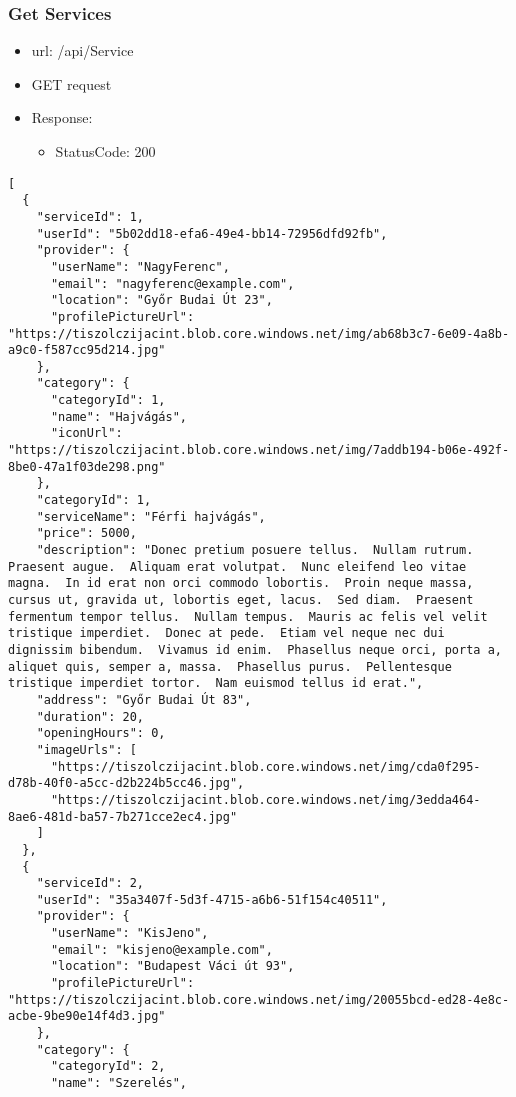 \documentclass[11pt]{article}
\begin{document}
\subsubsection{Get Services}
\label{sec:org1448e36}
\begin{itemize}
\item url: /api/Service
\item GET request
\item Response:
\begin{itemize}
\item StatusCode: 200
\end{itemize}
\end{itemize}
\begin{verbatim}
[
  {
    "serviceId": 1,
    "userId": "5b02dd18-efa6-49e4-bb14-72956dfd92fb",
    "provider": {
      "userName": "NagyFerenc",
      "email": "nagyferenc@example.com",
      "location": "Győr Budai Út 23",
      "profilePictureUrl": "https://tiszolczijacint.blob.core.windows.net/img/ab68b3c7-6e09-4a8b-a9c0-f587cc95d214.jpg"
    },
    "category": {
      "categoryId": 1,
      "name": "Hajvágás",
      "iconUrl": "https://tiszolczijacint.blob.core.windows.net/img/7addb194-b06e-492f-8be0-47a1f03de298.png"
    },
    "categoryId": 1,
    "serviceName": "Férfi hajvágás",
    "price": 5000,
    "description": "Donec pretium posuere tellus.  Nullam rutrum.  Praesent augue.  Aliquam erat volutpat.  Nunc eleifend leo vitae magna.  In id erat non orci commodo lobortis.  Proin neque massa, cursus ut, gravida ut, lobortis eget, lacus.  Sed diam.  Praesent fermentum tempor tellus.  Nullam tempus.  Mauris ac felis vel velit tristique imperdiet.  Donec at pede.  Etiam vel neque nec dui dignissim bibendum.  Vivamus id enim.  Phasellus neque orci, porta a, aliquet quis, semper a, massa.  Phasellus purus.  Pellentesque tristique imperdiet tortor.  Nam euismod tellus id erat.",
    "address": "Győr Budai Út 83",
    "duration": 20,
    "openingHours": 0,
    "imageUrls": [
      "https://tiszolczijacint.blob.core.windows.net/img/cda0f295-d78b-40f0-a5cc-d2b224b5cc46.jpg",
      "https://tiszolczijacint.blob.core.windows.net/img/3edda464-8ae6-481d-ba57-7b271cce2ec4.jpg"
    ]
  },
  {
    "serviceId": 2,
    "userId": "35a3407f-5d3f-4715-a6b6-51f154c40511",
    "provider": {
      "userName": "KisJeno",
      "email": "kisjeno@example.com",
      "location": "Budapest Váci út 93",
      "profilePictureUrl": "https://tiszolczijacint.blob.core.windows.net/img/20055bcd-ed28-4e8c-acbe-9be90e14f4d3.jpg"
    },
    "category": {
      "categoryId": 2,
      "name": "Szerelés",

\end{verbatim}
\end{document}
